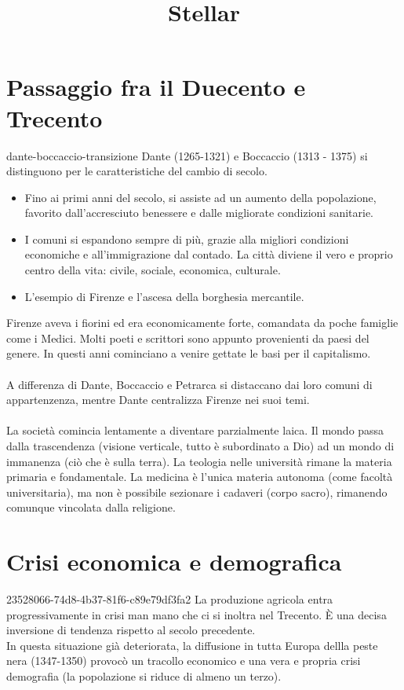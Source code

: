 \documentclass[preview]{standalone}
\begin{document}
\title{Stellar}
\genpage

\section{Passaggio fra il Duecento e Trecento}

\begin{snippet}{dante-boccaccio-transizione}
    Dante (1265-1321) e Boccaccio (1313 - 1375)
    si distinguono per le caratteristiche del cambio di secolo.
    
    \begin{itemize}
        \item Fino ai primi anni del secolo, si assiste ad un aumento della popolazione, favorito dall'accresciuto benessere e dalle migliorate condizioni sanitarie.
        \item I comuni si espandono sempre di più, grazie alla migliori condizioni economiche e all'immigrazione dal contado. La città diviene il vero e proprio centro della vita: civile, sociale, economica, culturale.
        \item L'esempio di Firenze e l'ascesa della borghesia mercantile.
    \end{itemize}
    
    Firenze aveva i fiorini ed era economicamente forte, comandata da poche famiglie come i Medici.
    Molti poeti e scrittori sono appunto provenienti da paesi del genere.
    In questi anni cominciano a venire gettate le basi per il capitalismo.
    \\\\
    A differenza di Dante, Boccaccio e Petrarca si distaccano dai loro comuni di appartenzenza,
    mentre Dante centralizza Firenze nei suoi temi.
    \\\\
    La società comincia lentamente a diventare parzialmente laica.
    Il mondo passa dalla trascendenza (visione verticale, tutto è subordinato a Dio)
    ad un mondo di immanenza (ciò che è sulla terra).
    La teologia nelle università rimane la materia primaria e fondamentale.
    La medicina è l'unica materia autonoma (come facoltà universitaria), ma non è possibile sezionare i cadaveri (corpo sacro),
    rimanendo comunque vincolata dalla religione.
\end{snippet}

\section{Crisi economica e demografica}

\begin{snippet}{23528066-74d8-4b37-81f6-c89e79df3fa2}
    La produzione agricola entra progressivamente in crisi man mano che ci si inoltra nel Trecento.
    È una decisa inversione di tendenza rispetto al secolo precedente.\\
    In questa situazione già deteriorata, la diffusione in tutta Europa dellla peste nera (1347-1350) provocò
    un tracollo economico e una vera e propria crisi demografia (la popolazione si riduce di almeno un terzo).
\end{snippet}
\end{document}
